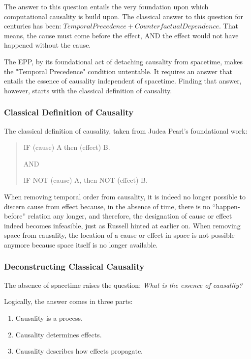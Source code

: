 The answer to this question entails the very foundation upon which computational causality is build upon. 
The classical answer to this question for centuries has been: $Temporal Precedence + Counterfactual Dependence$.
That means, the cause must come before the effect, AND the effect would not have happened without the cause. 

The EPP, by its foundational act of detaching causality from spacetime, makes the "Temporal Precedence" condition untentable. 
It requires an answer that entails the essence of causality independent of spacetime. Finding that answer, however, 
starts with the classical definition of causality.


\subsubsection{Classical Definition of Causality}


The classical definition of causality, taken from Judea Pearl's foundational work\cite{pearl2000causality}: 

\begin{quote}
    IF (cause) A then (effect) B.
    
    AND 
    
    IF NOT (cause) A, then NOT (effect) B.
\end{quote}

When removing temporal order from causality, it is indeed no longer possible to discern cause from effect because, in the absence of time, there is no “happen-before” relation any longer, and therefore, the designation of cause or effect indeed becomes infeasible, just as Russell hinted at earlier on. When removing space from causality, the location of a cause or effect in space is not possible anymore because space itself is no longer available. 

\subsubsection{Deconstructing Classical Causality}

The absence of spacetime raises the question: \textit{What is the essence of causality?}

Logically, the answer comes in three parts:

\begin{enumerate}
    \item Causality is a process.
    \item Causality determines effects.
    \item Causality describes how effects propagate.
\end{enumerate}


